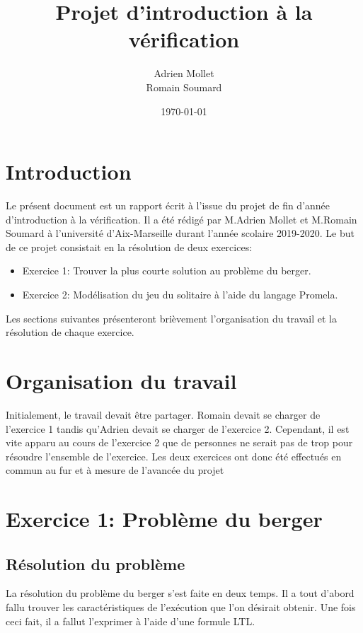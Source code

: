 \documentclass[12pt, a4paper]{report}
\title{\color{blue}Projet d'introduction à la vérification}
\date{\today}
\author{Adrien Mollet\\ Romain Soumard}
\begin{document}
\maketitle

\section{Introduction}

Le présent document est un rapport écrit à l'issue du projet de fin d'année d'introduction à la vérification. Il a été rédigé par M.Adrien Mollet et M.Romain Soumard à l'université d'Aix-Marseille durant l'année scolaire 2019-2020.
Le but de ce projet consistait en la résolution de deux exercices:
\begin{itemize}
\item Exercice 1: Trouver la plus courte solution au problème du berger.
\item Exercice 2: Modélisation du jeu du solitaire à l'aide du langage Promela.
\end{itemize}
Les sections suivantes présenteront brièvement l'organisation du travail et la résolution de chaque exercice.

\section{Organisation du travail}

Initialement, le travail devait être partager. Romain devait se charger de l'exercice 1 tandis qu'Adrien devait se charger de l'exercice 2. Cependant, il est vite apparu au cours de l'exercice 2 que de personnes ne serait pas de trop pour résoudre l'ensemble de l'exercice.
Les deux exercices ont donc été effectués en commun au fur et à mesure de l'avancée du projet

\section{Exercice 1: Problème du berger}

\subsection{Résolution du problème}

La résolution du problème du berger s'est faite en deux temps. Il a tout d'abord fallu trouver les caractéristiques de l'exécution que l'on désirait obtenir. Une fois ceci fait, il a fallut l'exprimer à l'aide d'une formule LTL.
\end{document}
